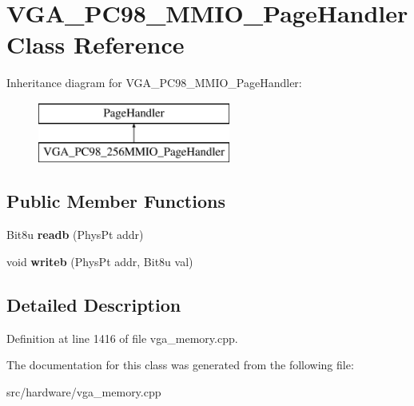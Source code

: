 \hypertarget{classVGA__PC98__256MMIO__PageHandler}{\section{V\-G\-A\-\_\-\-P\-C98\-\_\-M\-M\-I\-O\-\_\-\-Page\-Handler Class Reference}
\label{classVGA__PC98__256MMIO__PageHandler}
}
Inheritance diagram for V\-G\-A\-\_\-\-P\-C98\-\_\-M\-M\-I\-O\-\_\-\-Page\-Handler\-:\begin{figure}[H]
\begin{center}
\leavevmode
\includegraphics[height=2.000000cm]{classVGA__PC98__256MMIO__PageHandler}
\end{center}
\end{figure}
\subsection*{Public Member Functions}
\begin{DoxyCompactItemize}
\item 
\hypertarget{classVGA__PC98__256MMIO__PageHandler_a0d6629ec98ffef50737ec4209c81c579}{Bit8u {\bfseries readb} (Phys\-Pt addr)}\label{classVGA__PC98__256MMIO__PageHandler_a0d6629ec98ffef50737ec4209c81c579}

\item 
\hypertarget{classVGA__PC98__256MMIO__PageHandler_a18842c943f5e5f8edd481e1e6a1d8939}{void {\bfseries writeb} (Phys\-Pt addr, Bit8u val)}\label{classVGA__PC98__256MMIO__PageHandler_a18842c943f5e5f8edd481e1e6a1d8939}

\end{DoxyCompactItemize}


\subsection{Detailed Description}


Definition at line 1416 of file vga\-\_\-memory.\-cpp.



The documentation for this class was generated from the following file\-:\begin{DoxyCompactItemize}
\item 
src/hardware/vga\-\_\-memory.\-cpp\end{DoxyCompactItemize}
